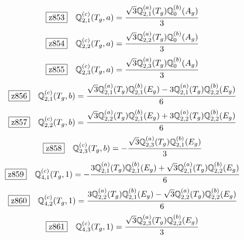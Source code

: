 \documentclass[fleqn,10pt,landscape]{jsarticle}
\begin{document}
\begin{dmath*}
\hspace*{3mm}\fbox{z853}\quad \mathbb{Q}_{2,1}^{(c)}(T_{g},a)=\frac{\sqrt{3} \mathbb{Q}_{2,1}^{(a)}(T_{g}) \mathbb{Q}_{0}^{(b)}(A_{g})}{3}
\end{dmath*}
\begin{dmath*}
\hspace*{3mm}\fbox{z854}\quad \mathbb{Q}_{2,2}^{(c)}(T_{g},a)=\frac{\sqrt{3} \mathbb{Q}_{2,2}^{(a)}(T_{g}) \mathbb{Q}_{0}^{(b)}(A_{g})}{3}
\end{dmath*}
\begin{dmath*}
\hspace*{3mm}\fbox{z855}\quad \mathbb{Q}_{2,3}^{(c)}(T_{g},a)=\frac{\sqrt{3} \mathbb{Q}_{2,3}^{(a)}(T_{g}) \mathbb{Q}_{0}^{(b)}(A_{g})}{3}
\end{dmath*}
\begin{dmath*}
\hspace*{3mm}\fbox{z856}\quad \mathbb{Q}_{2,1}^{(c)}(T_{g},b)=\frac{\sqrt{3} \mathbb{Q}_{2,1}^{(a)}(T_{g}) \mathbb{Q}_{2,1}^{(b)}(E_{g}) - 3 \mathbb{Q}_{2,1}^{(a)}(T_{g}) \mathbb{Q}_{2,2}^{(b)}(E_{g})}{6}
\end{dmath*}
\begin{dmath*}
\hspace*{3mm}\fbox{z857}\quad \mathbb{Q}_{2,2}^{(c)}(T_{g},b)=\frac{\sqrt{3} \mathbb{Q}_{2,2}^{(a)}(T_{g}) \mathbb{Q}_{2,1}^{(b)}(E_{g}) + 3 \mathbb{Q}_{2,2}^{(a)}(T_{g}) \mathbb{Q}_{2,2}^{(b)}(E_{g})}{6}
\end{dmath*}
\begin{dmath*}
\hspace*{3mm}\fbox{z858}\quad \mathbb{Q}_{2,3}^{(c)}(T_{g},b)=- \frac{\sqrt{3} \mathbb{Q}_{2,3}^{(a)}(T_{g}) \mathbb{Q}_{2,1}^{(b)}(E_{g})}{3}
\end{dmath*}
\begin{dmath*}
\hspace*{3mm}\fbox{z859}\quad \mathbb{Q}_{4,1}^{(c)}(T_{g},1)=- \frac{3 \mathbb{Q}_{2,1}^{(a)}(T_{g}) \mathbb{Q}_{2,1}^{(b)}(E_{g}) + \sqrt{3} \mathbb{Q}_{2,1}^{(a)}(T_{g}) \mathbb{Q}_{2,2}^{(b)}(E_{g})}{6}
\end{dmath*}
\begin{dmath*}
\hspace*{3mm}\fbox{z860}\quad \mathbb{Q}_{4,2}^{(c)}(T_{g},1)=\frac{3 \mathbb{Q}_{2,2}^{(a)}(T_{g}) \mathbb{Q}_{2,1}^{(b)}(E_{g}) - \sqrt{3} \mathbb{Q}_{2,2}^{(a)}(T_{g}) \mathbb{Q}_{2,2}^{(b)}(E_{g})}{6}
\end{dmath*}
\begin{dmath*}
\hspace*{3mm}\fbox{z861}\quad \mathbb{Q}_{4,3}^{(c)}(T_{g},1)=\frac{\sqrt{3} \mathbb{Q}_{2,3}^{(a)}(T_{g}) \mathbb{Q}_{2,2}^{(b)}(E_{g})}{3}
\end{dmath*}
\end{document}
